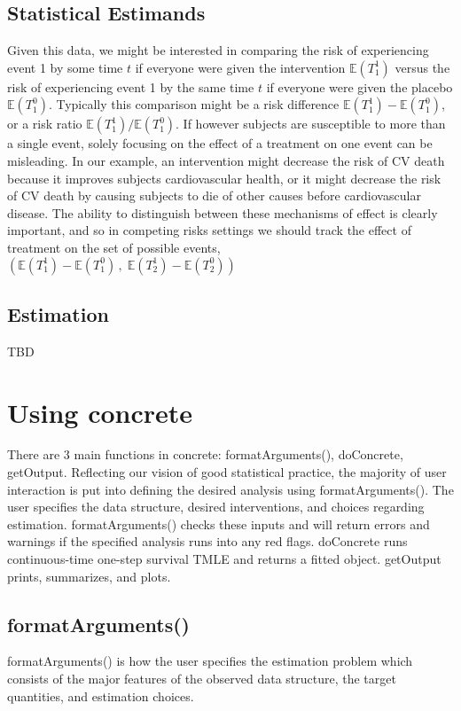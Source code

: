 \documentclass{report}
\newcommand{\1}{\ensuremath{\mathbf{1}}}
\begin{document}
\section{Statistical Estimands}
Given this data, we might be interested in comparing the risk of experiencing event 1 by some time \(t\) if everyone were given the intervention \(\mathbb{E}(T^1_1)\) versus the risk of experiencing event 1 by the same time \(t\) if everyone were given the placebo \(\mathbb{E}(T^0_1)\). Typically this comparison might be a risk difference \(\mathbb{E}(T^1_1) - \mathbb{E}(T^0_1)\), or a risk ratio \(\mathbb{E}(T^1_1) / \mathbb{E}(T^0_1)\).
If however subjects are susceptible to more than a single event, solely focusing on the effect of a treatment on one event can be misleading. In our example, an intervention might decrease the risk of CV death because it improves subjects cardiovascular health, or it might decrease the risk of CV death by causing subjects to die of other causes before cardiovascular disease. The ability to distinguish between these mechanisms of effect is clearly important, and so in competing risks settings we should track the effect of treatment on the set of possible events, \(\left(\mathbb{E}(T^1_1) - \mathbb{E}(T^0_1)\,,\;\mathbb{E}(T^1_2) - \mathbb{E}(T^0_2)\right)\)

\section{Estimation}
TBD

\chapter{Using concrete}
There are 3 main functions in concrete: formatArguments(), doConcrete, getOutput. Reflecting our vision of good statistical practice, the majority of user interaction is put into defining the desired analysis using formatArguments(). The user specifies the data structure, desired interventions, and choices regarding estimation. formatArguments() checks these inputs and will return errors and warnings if the specified analysis runs into any red flags. doConcrete runs continuous-time one-step survival TMLE and returns a fitted object. getOutput prints, summarizes, and plots.  

\section{formatArguments()}
formatArguments() is how the user specifies the estimation problem which consists of the major features of the observed data structure, the target quantities, and estimation choices.
\end{document}
